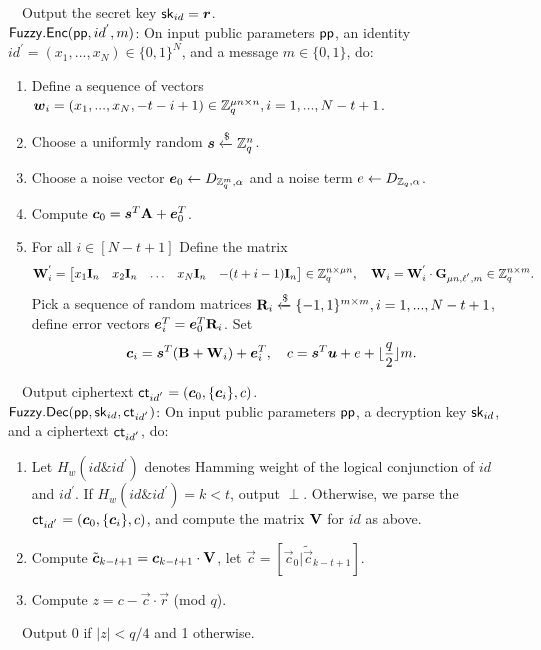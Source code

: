 ~~Output the secret key $\mathsf{sk}_{id}=\boldsymbol{r}$.\\[0.4cm]
$\mathsf{Fuzzy}.\mathsf{Enc}(\mathsf{pp}, id^{'}, m)$: On input public parameters $\mathsf{pp}$, an identity $id^{'}=(x_{1},...,x_{N}) \in \{0,1\}^{N}$, and a message $m \in \{0,1\}$, do:
\begin{enumerate}
\item Define a sequence of vectors $\boldsymbol{w}_{i}=(x_{1},...,x_{N},-t-i+1) \in \mathbb{Z}^{\mu n \times n}_{q}, i=1,...,N-t+1$.
\item Choose a uniformly random $\boldsymbol{s}\xleftarrow{\$} \mathbb{Z}^{n}_{q}$.
\item Choose a noise vector $\boldsymbol{e}_{0}\leftarrow D_{\mathbb{Z}^{m}_{q},\alpha}$ and a noise term $e\leftarrow D_{\mathbb{Z}_{q},\alpha}$.
\item Compute $\boldsymbol{c}_{0}=\boldsymbol{s}^{T}\mathbf{A}+\boldsymbol{e}^{T}_{0}$.
\item For all $i \in [N-t+1]$ Define the matrix
\begin{equation}
\mathbf{W}^{'}_{i}= \begin{bmatrix}
x_{1} \mathbf{I}_{n}&x_{2} \mathbf{I}_{n}&\ldots&x_{N} \mathbf{I}_{n}& -(t+i-1)\mathbf{I}_{n}
\end{bmatrix} \in \mathbb{Z}^{n \times \mu n}_{q},~~~ \mathbf{W}_{i}=\mathbf{W}^{'}_{i}\cdot \mathbf{G}_{\mu n,\ell^{'},m} \in \mathbb{Z}^{n \times m}_{q}.
\end{equation}
Pick a sequence of random matrices $\mathbf{R}_{i}\xleftarrow{\$} \{-1,1\}^{m \times m}, i=1,...,N-t+1$, define error vectors $\boldsymbol{e}^{T}_{i}=\boldsymbol{e}^{T}_{0}\mathbf{R}_{i}$. Set
\begin{equation}
\boldsymbol{c}_{i}=\boldsymbol{s}^{T}(\mathbf{B}+\mathbf{W}_{i})+\boldsymbol{e}^{T}_{i},~~~c=\boldsymbol{s}^{T}\boldsymbol{u}+e+\lfloor \frac{q}{2} \rfloor m.
\end{equation}
\end{enumerate}
~~Output ciphertext  $\mathsf{ct}_{id^{'}}=(\boldsymbol{c}_{0},\{\boldsymbol{c}_{i}\},c)$.\\[0.4cm]
$\mathsf{Fuzzy}.\mathsf{Dec}(\mathsf{pp}, \mathsf{sk}_{id}, \mathsf{ct}_{id^{'}})$: On input public parameters $\mathsf{pp}$, a decryption key $\mathsf{sk}_{id}$, and a ciphertext $\mathsf{ct}_{id^{'}}$, do:
\begin{enumerate}
\item Let $H_{w}(id \& id^{'})$ denotes Hamming weight of the logical conjunction of $id$ and $id^{'}$. If $H_{w}(id \& id^{'})=k<t$, output $\perp$. Otherwise, we parse the $\mathsf{ct}_{id^{'}}=(\boldsymbol{c}_{0},\{\boldsymbol{c}_{i}\},c)$, and compute the matrix $\mathbf{V}$ for $id$ as above.
\item Compute $\tilde{\boldsymbol{c}}_{k-t+1}=\boldsymbol{c}_{k-t+1}\cdot \mathbf{V}$, let $\vec{c}=[\vec{c}_{0}|\tilde{\vec{c}}_{k-t+1}]$.
\item Compute $z=c-\vec{c}\cdot \vec{r}$ (mod $q$).
\end{enumerate}
~~Output $0$ if $|z|< q/4$ and 1 otherwise.
